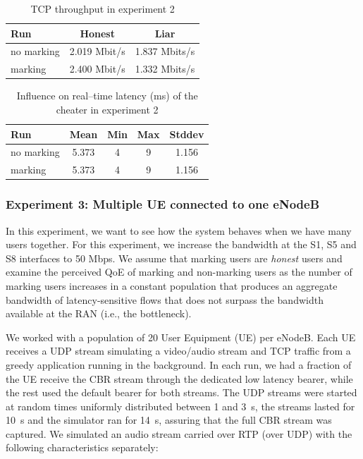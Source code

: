 \documentclass[12pt]{article}
\begin{document}
\begin{table}[h!]
  \centering
    \label{tab:cheat-throughput}
    \begin{tabular}{l  c c }
      \toprule
      Run & Honest & Liar \\
      \midrule
      no marking & 2.019 Mbit/s & 1.837 Mbits/s \\
      marking & 2.400 Mbit/s & 1.332 Mbits/s \\
      \bottomrule
    \end{tabular}
    \caption{TCP throughput in experiment 2}
\end{table}

\begin{table}[t!]
  \centering
  \label{tab:cheater-cbr}
  \begin{tabular}{l c c c c}
    \toprule
    Run & Mean & Min & Max & Stddev \\
    \midrule
    no marking & 5.373 & 4 & 9 & 1.156 \\
    marking & 5.373 & 4 & 9 & 1.156 \\
    \bottomrule
  \end{tabular}
  \caption{Influence on real--time latency (ms) of the cheater in experiment 2}
\end{table}

\subsubsection{Experiment 3: Multiple UE connected to one eNodeB}
\label{sec:manyusers-val}

In this experiment, we want to see how the system behaves when we have many
users together. For this experiment, we increase the bandwidth at the S1, S5
and S8 interfaces to 50 Mbps. We assume that marking users are \textit{honest}
users and examine the perceived QoE of marking and non-marking users as the
number of marking users increases in a constant population that produces an
aggregate bandwidth of latency-sensitive flows that does not surpass the
bandwidth available at the RAN (i.e., the bottleneck).

We worked with a population of 20 User Equipment (UE) per eNodeB. Each UE
receives a UDP stream simulating a video/audio stream and TCP traffic from a
greedy application running in the background.  In each run, we had a fraction
of the UE receive the CBR stream through the dedicated low latency bearer,
while the rest used the default bearer for both streams. The UDP streams were
started at random times uniformly distributed between 1 and 3~s, the streams
lasted for 10~s and the simulator ran for 14~s, assuring that the full CBR
stream was captured. We simulated an audio stream carried over RTP (over UDP)
with the following characteristics separately:
\end{document}
